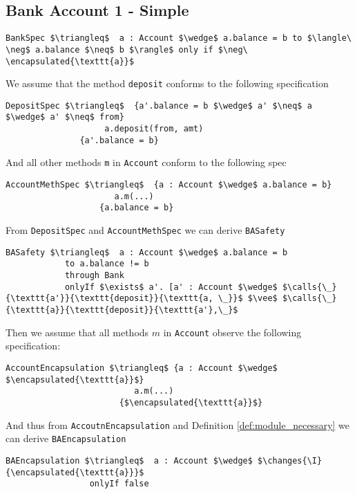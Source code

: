 \documentclass[acmsmall,review,anonymous]{acmart}\settopmatter{printfolios=true,printccs=false,printacmref=false}
\begin{document}
\subsection{Bank Account 1 - Simple}
\label{ex:bank1}
\begin{lstlisting}[language = Chainmail, mathescape=true, frame=lines]
BankSpec $\triangleq$  a : Account $\wedge$ a.balance = b to $\langle\ \neg$ a.balance $\neq$ b $\rangle$ only if $\neg\ \encapsulated{\texttt{a}}$
\end{lstlisting}
We assume that the method \texttt{deposit} conforms to the following 
specification
\begin{lstlisting}[language = Chainmail, mathescape=true, frame=lines]
DepositSpec $\triangleq$  {a'.balance = b $\wedge$ a' $\neq$ a $\wedge$ a' $\neq$ from}
					a.deposit(from, amt) 
			   {a'.balance = b}
\end{lstlisting}
And all other methods \texttt{m} in \texttt{Account} conform to the 
following spec
\begin{lstlisting}[language = Chainmail, mathescape=true, frame=lines]
AccountMethSpec $\triangleq$  {a : Account $\wedge$ a.balance = b}
					  a.m(...) 
			       {a.balance = b}
\end{lstlisting}
From \texttt{DepositSpec} and \texttt{AccountMethSpec} we can derive \texttt{BASafety}
\begin{lstlisting}[language = Chainmail, mathescape=true]
BASafety $\triangleq$  a : Account $\wedge$ a.balance = b 
            to a.balance != b
            through Bank
            onlyIf $\exists$ a'. [a' : Account $\wedge$ $\calls{\_}{\texttt{a'}}{\texttt{deposit}}{\texttt{a, \_}}$ $\vee$ $\calls{\_}{\texttt{a}}{\texttt{deposit}}{\texttt{a'},\_}$
\end{lstlisting}
Then we assume that all methods $m$ in \texttt{Account} observe the following specification:
\begin{lstlisting}[language = Chainmail, mathescape=true, frame=lines]
AccountEncapsulation $\triangleq$ {a : Account $\wedge$ $\encapsulated{\texttt{a}}$}
				          a.m(...)
				       {$\encapsulated{\texttt{a}}$}
\end{lstlisting}
And thus from \texttt{AccoutnEncapsulation} and Definition \ref{def:module_necessary} we can derive \texttt{BAEncapsulation}
\begin{lstlisting}[language = Chainmail, mathescape=true, frame=lines]
BAEncapsulation $\triangleq$  a : Account $\wedge$ $\changes{\I}{\encapsulated{\texttt{a}}}$
                 onlyIf false
\end{lstlisting}
\end{document}
